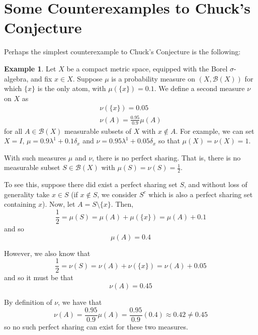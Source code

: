 \documentclass[12pt]{article}
\theoremstyle{definition}
\newtheorem{example}{Example}
\begin{document}
\section*{Some Counterexamples to Chuck's Conjecture}

Perhaps the simplest counterexample to Chuck's Conjecture is the following:

\begin{example}
    Let $X$ be a compact metric space, equipped with the Borel $\sigma$-algebra,
    and fix $x\in X$. Suppose $\mu$ is a probability measure on
    $(X,\mathscr{B}(X))$ for which $\{x\}$ is the only atom, with
    $\mu(\{x\})=0.1$. We define a second measure $\nu$ on $X$ as
    \[
        \begin{aligned}
            \nu(\{x\}) = 0.05\\
            \nu(A) = \frac{0.95}{0.9}\mu(A)
        \end{aligned}
    \]
    for all $A\in\mathscr{B}(X)$ measurable subsets of $X$ with $x\not\in A$.
    For example, we can set $X=I$, $\mu = 0.9\lambda^1 + 0.1\delta_x$ and $\nu =
    0.95\lambda^1 + 0.05\delta_x$ so that $\mu(X)=\nu(X)=1$. 

    With such measures $\mu$ and $\nu$, there is no perfect sharing. That is,
    there is no measurable subset $S\in\mathscr{B}(X)$ with
    $\mu(S)=\nu(S)=\frac{1}{2}$. 

    To see this, suppose there did exist a perfect sharing set $S$, and without
    loss of generality take $x\in S$ (if $x\not\in S$, we consider $S^c$ which
    is also a perfect sharing set containing $x$). Now, let $A=S\setminus\{x\}$.
    Then,
    \[
        \frac{1}{2} = \mu(S) = \mu(A) + \mu(\{x\}) = \mu(A) + 0.1
    \]
    and so
    \[
        \mu(A) = 0.4
    \]

    However, we also know that
    \[
        \frac{1}{2} = \nu(S) = \nu(A) + \nu(\{x\}) = \nu(A) + 0.05
    \]
    and so it must be that
    \[
        \nu(A) = 0.45
    \]

    By definition of $\nu$, we have that
    \[
        \nu(A) = \frac{0.95}{0.9}\mu(A) = \frac{0.95}{0.9}(0.4) \approx 0.42\neq
        0.45
    \]
    so no such perfect sharing can exist for these two measures.

\end{example}
\end{document}
